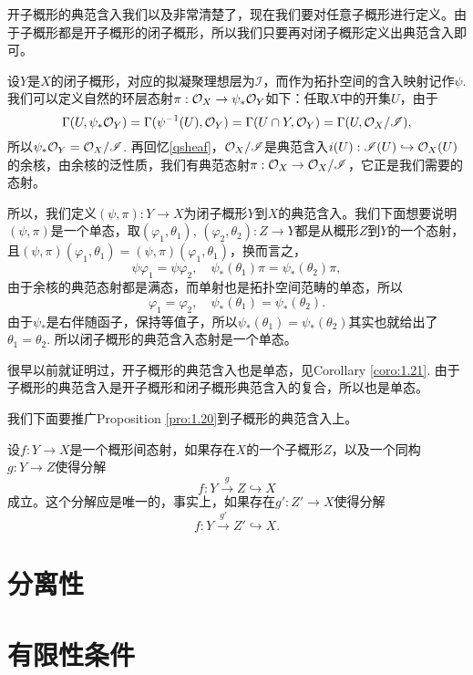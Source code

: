 \begin{para}[子概形的典范含入]
开子概形的典范含入我们以及非常清楚了，现在我们要对任意子概形进行定义。由于子概形都是开子概形的闭子概形，所以我们只要再对闭子概形定义出典范含入即可。

设$Y$是$X$的闭子概形，对应的拟凝聚理想层为$\mathscr I$，而作为拓扑空间的含入映射记作$\psi$. 我们可以定义自然的环层态射$\pi:\mathcal{O}_X\to \psi_*\mathcal{O}_Y$如下：任取$X$中的开集$U$，由于
\[
	\Gamma(U,\psi_*\mathcal{O}_Y)=\Gamma(\psi^{-1}(U),\mathcal{O}_Y)=\Gamma(U\cap Y,\mathcal{O}_Y)=\Gamma(U,\mathcal{O}_X/\mathscr I),
\]
所以$\psi_*\mathcal{O}_Y=\mathcal{O}_X/\mathscr I$. 再回忆\ref{qsheaf}，$\mathcal{O}_X/\mathscr I$是典范含入$i(U):\mathscr I(U)\hookrightarrow \mathcal{O}_X(U)$的余核，由余核的泛性质，我们有典范态射$\pi:\mathcal{O}_X\to \mathcal{O}_X/\mathscr I$，它正是我们需要的态射。

所以，我们定义$(\psi,\pi):Y\to X$为闭子概形$Y$到$X$的典范含入。我们下面想要说明$(\psi,\pi)$是一个单态，取$(\varphi_1,\theta_1)$, $(\varphi_2,\theta_2):Z\to Y$都是从概形$Z$到$Y$的一个态射，且$(\psi,\pi)(\varphi_1,\theta_1)=(\psi,\pi)(\varphi_1,\theta_1)$，换而言之，
\[
	\psi\varphi_1=\psi\varphi_2,\quad \psi_*(\theta_1)\pi=\psi_*(\theta_2)\pi,
\]
由于余核的典范态射都是满态，而单射也是拓扑空间范畴的单态，所以
\[
	\varphi_1=\varphi_2,\quad \psi_*(\theta_1)=\psi_*(\theta_2).
\]
由于$\psi_*$是右伴随函子，保持等值子，所以$\psi_*(\theta_1)=\psi_*(\theta_2)$其实也就给出了$\theta_1=\theta_2$. 所以闭子概形的典范含入态射是一个单态。

很早以前就证明过，开子概形的典范含入也是单态，见Corollary \ref{coro:1.21}. 由于子概形的典范含入是开子概形和闭子概形典范含入的复合，所以也是单态。
\end{para}

\begin{para}
我们下面要推广Proposition \ref{pro:1.20}到子概形的典范含入上。
\end{para}

\begin{para}[浸入态射]
设$f:Y\to X$是一个概形间态射，如果存在$X$的一个子概形$Z$，以及一个同构$g:Y\to Z$使得分解
\[
	f:Y\xrightarrow{g} Z\hookrightarrow X
\]
成立。这个分解应是唯一的，事实上，如果存在$g':Z'\to X$使得分解
\[
	f:Y\xrightarrow{g'} Z'\hookrightarrow X.
\]
\end{para}

\section{分离性}

\section{有限性条件}
